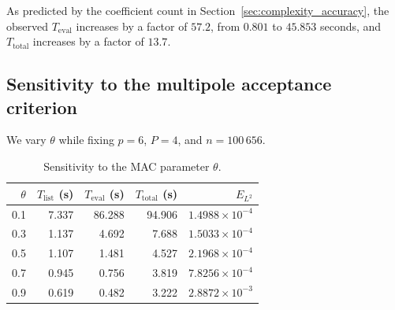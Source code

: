 \documentclass[a4paper,10pt]{article}
\begin{document}
As predicted by the coefficient count in
Section~\ref{sec:complexity_accuracy}, the observed
\(T_{\mathrm{eval}}\) increases by a factor of \(57.2\), from \(0.801\)
to \(45.853\) seconds, and \(T_{\mathrm{total}}\) increases by a factor
of \(13.7\).

\subsection{Sensitivity to the multipole acceptance criterion}

We vary \(\theta\) while fixing \(p=6\), \(P=4\), and \(n=100\,656\).

\begin{table}[H]
\centering
\caption{Sensitivity to the MAC parameter \(\theta\).}
\label{tab:experiment_theta_compact}
\begin{tabular}{rrrrr}
\toprule
\(\theta\) & \(T_{\mathrm{list}}\) (s) & \(T_{\mathrm{eval}}\) (s) &
\(T_{\mathrm{total}}\) (s) & \(E_{L^2}\)\\
\midrule
0.1 & 7.337 & 86.288 & 94.906 & \(1.4988\times10^{-4}\)\\
0.3 & 1.137 & 4.692  & 7.688  & \(1.5033\times10^{-4}\)\\
0.5 & 1.107 & 1.481  & 4.527  & \(2.1968\times10^{-4}\)\\
0.7 & 0.945 & 0.756  & 3.819  & \(7.8256\times10^{-4}\)\\
0.9 & 0.619 & 0.482  & 3.222  & \(2.8872\times10^{-3}\)\\
\bottomrule
\end{tabular}
\end{table}
\end{document}
